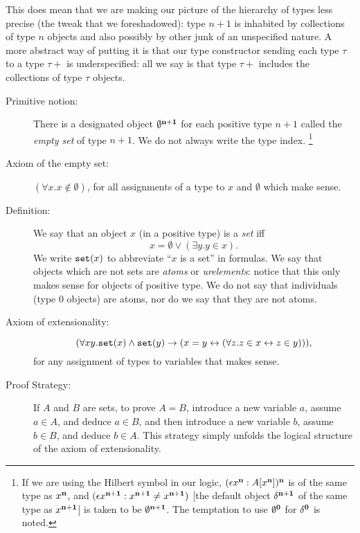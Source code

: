 \documentclass[12pt]{book}
\begin{document}
This does mean that we are making our picture of the hierarchy of
types less precise (the tweak that we foreshadowed): type $n+1$ is inhabited by collections of type $n$
objects and also possibly by other junk of an unspecified nature.  A more abstract way of putting it is that our type constructor sending each type $\tau$ to a type $\tau+$ is underspecified:  all we say is that type $\tau+$ includes the collections of type $\tau$ objects.

\begin{description}

\item[Primitive notion:] There is a designated object $\emptyset^{\bf
n+1}$ for each positive type $n+1$ called the {\em empty set\/} of
type $n+1$.  We do not always write the type index.  \footnote{ If we are using the Hilbert symbol in our logic, $(\epsilon x^{\bf n}:A[x^{\bf n}])^{\bf n}$ is of the same type as $x^{\bf n}$, and $(\epsilon x^{\bf n+1}:x^{\bf n+1} \neq x^{\bf n+1})$ [the default object $\delta^{\bf n+1}$ of the same type as $x^{\bf n+1}$] is taken to be $\emptyset^{\bf n+1}$.  The temptation to use $\emptyset^{\bf 0}$ for $\delta^{\bf 0}$ is noted.}

\item[Axiom of the empty set:] $(\forall x.x\not\in \emptyset)$, for
all assignments of a type to $x$ and $\emptyset$ which make sense.

\item[Definition:] We say that an object $x$ (in a positive type) is a
{\em set\/} iff $$x = \emptyset \vee (\exists y.y \in x).$$  We write
${\tt set}(x)$ to abbreviate ``$x$ is a set'' in formulas.  We say
that objects which are not sets are {\em atoms} or {\em urelements\/}:  notice that this only makes sense for objects of positive type.  We do not say that individuals (type 0 objects) are atoms, nor do we say that they are not atoms.

\item[Axiom of extensionality:] $$(\forall xy.{\tt set}(x) \wedge {\tt
set}(y) \rightarrow (x=y\leftrightarrow (\forall z.z\in x
\leftrightarrow z\in y))),$$ for any assignment of types to variables that makes sense.

\item[Proof Strategy:] If $A$ and $B$ are sets, to prove $A=B$,
introduce a new variable $a$, assume $a \in A$, and deduce $a \in B$,
and then introduce a new variable $b$, assume $b \in B$, and deduce $b
\in A$.  This strategy simply unfolds the logical structure of the
axiom of extensionality.

\end{description}
\end{document}
